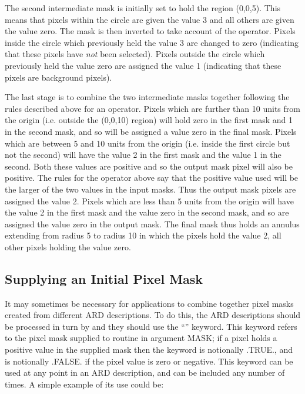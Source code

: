 \documentclass[11pt,nolof]{starlink}
\begin{document}
The second intermediate mask is initially set to hold the region (0,0,5).
This means that pixels within the circle are given the value 3 and all others
are given the value zero. The mask is then inverted to take account of the 
operator. Pixels inside the circle which previously held the value 3 are changed
to zero (indicating that these pixels have \emph{not} been selected). Pixels
outside the circle which previously held the value zero are assigned the value 1
(indicating that these pixels are background pixels).

The last stage is to combine the two intermediate masks together following the
rules described above for an  operator. Pixels which are further than 10
units from the origin (i.e. outside the (0,0,10) region) will hold zero in
the first mask and 1 in the second mask, and so will be assigned a
value zero in the final mask. Pixels which are between 5 and 10 units from the
origin (i.e. inside the first circle but not the second) will have the value 2
in the first mask and the value 1 in the second. Both these values are
positive and so the output mask pixel will also be positive. The rules for the
 operator above say that the positive value used will be the larger of the
two values in the input masks. Thus the output mask pixels are assigned the
value 2. Pixels which are less than 5 units from the origin will have the value
2 in the first mask and the value zero in the second mask, and so are assigned
the value zero in the output mask. The final mask thus holds an annulus
extending from radius 5 to radius 10 in which the pixels hold the value 2, all
other pixels holding the value zero.

\subsection{\label{SEC:MASK}Supplying an Initial Pixel Mask}
It may sometimes be necessary for applications to combine together pixel masks
created from different ARD descriptions. To do this, the ARD descriptions should
be processed in turn by  and they should use the ``'' keyword.
This keyword refers to the pixel mask supplied to routine  in argument
MASK; if a pixel holds a positive value in the supplied mask then the 
keyword is notionally .TRUE., and is notionally .FALSE. if the pixel value is
zero or negative. This keyword can be used at any point in an ARD description,
and can be included any number of times. A simple example of its use could be:
\end{document}
